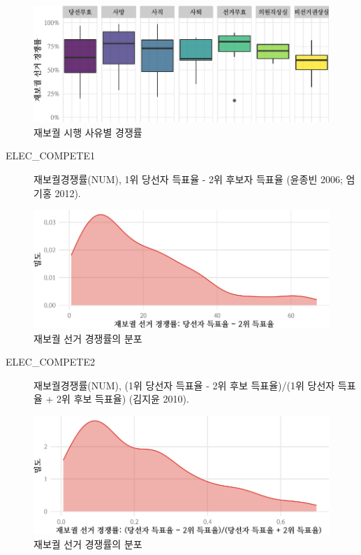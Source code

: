 \documentclass[
  11pt,
  letter]{article}
\begin{document}
\begin{figure}
\centering
\includegraphics{Codebook_national_files/figure-latex/unnamed-chunk-7-1.pdf}
\caption{재보궐 시행 사유별 경쟁률}
\end{figure}

\begin{description}
\item[ELEC\_COMPETE1]
재보궐경쟁률(NUM), 1위 당선자 득표율 - 2위 후보자 득표율 (윤종빈 2006;
엄기홍 2012).
\end{description}

\begin{figure}
\centering
\includegraphics{Codebook_national_files/figure-latex/unnamed-chunk-8-1.pdf}
\caption{재보궐 선거 경쟁률의 분포}
\end{figure}

\begin{description}
\item[ELEC\_COMPETE2]
재보궐경쟁률(NUM), (1위 당선자 득표율 - 2위 후보 득표율)/(1위 당선자
득표율 + 2위 후보 득표율) (김지윤 2010).
\end{description}

\begin{figure}
\centering
\includegraphics{Codebook_national_files/figure-latex/unnamed-chunk-9-1.pdf}
\caption{재보궐 선거 경쟁률의 분포}
\end{figure}
\end{document}
